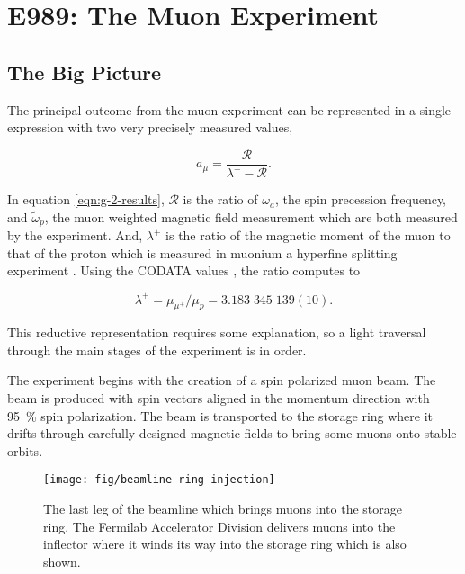 \chapter {E989: The Muon \gmtwo Experiment} \label{ch:expt}

\section{The Big Picture} \label{sec:expt-big-picture}

The principal outcome from the muon \gmtwo experiment can be represented in a single expression with two very precisely measured values,

\begin{equation}
\label{eqn:g-2-results}
a_\mu = \frac{\mathcal{R}}{\lambda^+ - \mathcal{R}}.
\end{equation}

\noindent 
In equation \ref{eqn:g-2-results}, $\mathcal{R}$ is the ratio of $\omega_a$, the spin precession frequency, and $\tilde{\omega}_p$, the muon weighted magnetic field measurement which are both measured by the experiment. And, $\lambda^+$ is the ratio of the magnetic moment of the muon to that of the proton which is measured in muonium a hyperfine splitting experiment \cite{muonium-hyperfine}.  Using the CODATA values \cite{codata}, the ratio computes to

\begin{equation}
\label{eqn:muon-to-proton-mu-ratio}
\lambda^+ = \mu_{\mu^+} / \mu_p = 3.183\;345\;139(10).
\end{equation}

\noindent
This reductive representation requires some explanation, so a light traversal through the main stages of the experiment is in order.

The experiment begins with the creation of a spin polarized muon beam.  The beam is produced with spin vectors aligned in the momentum direction with \SI{95}{\percent} spin polarization.  The beam is transported to the storage ring where it drifts through carefully designed magnetic fields to bring some muons onto stable orbits.

\begin{figure}
\label{fig:beamline-ring-injection}
\centering
\texttt{[image: fig/beamline-ring-injection]}
\caption{The last leg of the beamline which brings muons into the storage ring.  The Fermilab Accelerator Division delivers muons into the inflector where it winds its way into the storage ring which is also shown.}
\end{figure}


